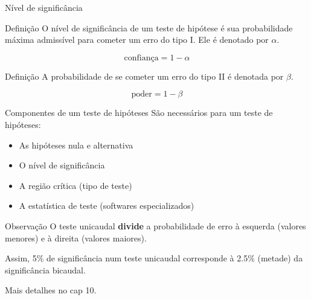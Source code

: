 \documentclass{beamer}
\begin{document}
\begin{frame}{\scriptsize Nível de significância}
  \begin{block}{Definição}
    \scriptsize
    O \alert{nível de significância} de um teste de hipótese é sua
    probabilidade máxima admissível para cometer um erro do tipo
    I. Ele é denotado por $\alpha$.

    \begin{displaymath}
      \text{confiança} = 1 - \alpha
    \end{displaymath}
  \end{block}
  \begin{block}{Definição}
    \scriptsize
    A probabilidade de se cometer um erro do tipo II é denotada por
    $\beta$.

    \begin{displaymath}
      \text{poder} = 1 - \beta
    \end{displaymath}
  \end{block}
\end{frame}

\begin{frame}{\scriptsize Componentes de um teste de hipóteses}
  \scriptsize
  São necessários para um teste de hipóteses:
  \bigskip
  \begin{itemize}
    \footnotesize
  \item As hipóteses nula e alternativa
  \item O nível de significância
  \item A região crítica (tipo de teste)
  \item A estatística de teste (softwares especializados)
  \end{itemize}
  \bigskip
  \begin{block}{Observação}
    \scriptsize
    O teste unicaudal {\bf divide} a probabilidade de erro à esquerda (valores menores) e à direita (valores maiores).

    \bigskip
    \scriptsize
    Assim, 5\% de significância num teste unicaudal corresponde à 2.5\% (metade) da significância bicaudal.

    \bigskip
    \tiny
    \hfill Mais detalhes no cap 10.
  \end{block}
\end{frame}
\end{document}
